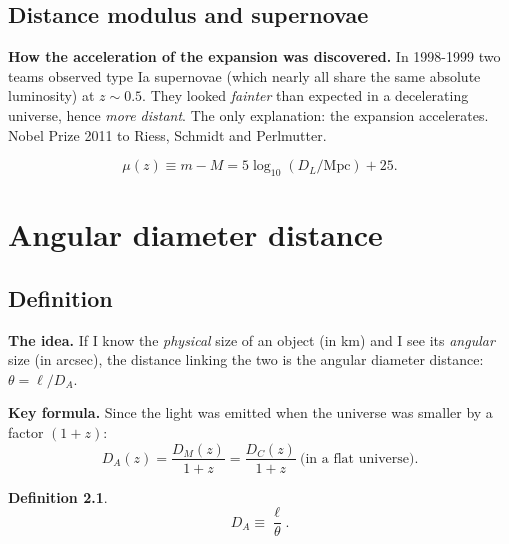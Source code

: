 \documentclass[11pt,a4paper,openany]{report}
\newcommand{\eqdef}{\equiv}
\newtheorem{definition}[theorem]{Definition}
\begin{document}
\section{Distance modulus and supernovae}

\begin{tcolorbox}[plain]
\textbf{How the acceleration of the expansion was discovered.} In 1998-1999 two
teams observed type Ia supernovae (which nearly all share the same absolute
luminosity) at $z\sim 0.5$. They looked \emph{fainter} than expected in a
decelerating universe, hence \emph{more distant}. The only explanation: the
expansion accelerates. Nobel Prize 2011 to Riess, Schmidt and Perlmutter.
\end{tcolorbox}

\begin{equation}
\mu(z) \eqdef m - M = 5\log_{10}(D_{L}/\text{Mpc}) + 25.
\label{eq:mu}
\end{equation}

\chapter{Angular diameter distance}
\label{chap:DA}

\section{Definition}

\begin{tcolorbox}[plain]
\textbf{The idea.} If I know the \emph{physical} size of an object (in km) and
I see its \emph{angular} size (in arcsec), the distance linking the two is the
angular diameter distance: $\theta = \ell/D_{A}$.
\end{tcolorbox}

\begin{tcolorbox}[undergrad]
\textbf{Key formula.} Since the light was emitted when the universe was smaller
by a factor $(1+z)$:
\[
D_{A}(z) = \frac{D_{M}(z)}{1+z} = \frac{D_{C}(z)}{1+z}~\text{(in a flat universe)}.
\]
\end{tcolorbox}

\begin{definition}
\begin{equation}
D_{A} \eqdef \frac{\ell}{\theta}.
\label{eq:DA_def}
\end{equation}
\end{definition}
\end{document}
